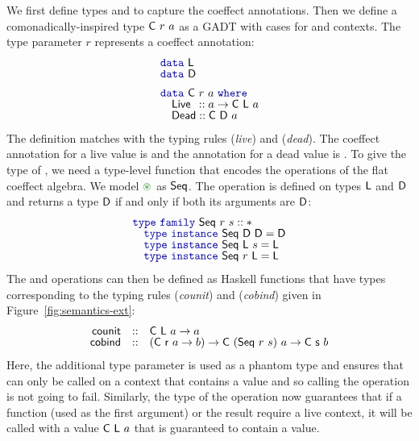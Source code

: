 We first define types  and  to capture the coeffect annotations.
Then we define a comonadically-inspired type $\textnormal{\sffamily C}~r~a$ as a GADT with cases for
 and  contexts. The type parameter $r$ represents a coeffect
annotation:
%
\begin{equation*}
\begin{array}{l}
\kvd{data}~\ident{L} \\[-0.2em]
\kvd{data}~\ident{D} \\[0.5em]
\kvd{data}~\ident{C}~r~a~\kvd{where} \\[-0.2em]
\quad \ident{Live} \hspace{0.45em}:: a \rightarrow \ident{C}~\ident{L}~a\\[-0.2em]
\quad \ident{Dead} :: \ident{C}~\ident{D}~a
\end{array}
\end{equation*}
%
The definition matches with the typing rules (\emph{live}) and (\emph{dead}). The coeffect
annotation for a live value is  and the annotation for a dead value is .
To give the type of , we need a type-level function that encodes the operations
of the flat coeffect algebra. We model $\cseq$ as $\textnormal{\sffamily Seq}$. The operation is defined
on types $\textnormal{\sffamily L}$ and $\textnormal{\sffamily D}$ and returns a type $\textnormal{\sffamily D}$ if and only if both its
arguments are $\textnormal{\sffamily D}$:
%
\begin{equation*}
\begin{array}{l}
\kvd{type}~\kvd{family}~\ident{Seq}~r~s :: *\\[-0.2em]
\quad \kvd{type}~\kvd{instance}~\ident{Seq}~\ident{D}~\ident{D} = \ident{D}\\[-0.2em]
\quad \kvd{type}~\kvd{instance}~\ident{Seq}~\ident{L}~s = \ident{L}\\[-0.2em]
\quad \kvd{type}~\kvd{instance}~\ident{Seq}~r~\ident{L} = \ident{L}
\end{array}
\end{equation*}
%
The  and  operations can then be defined as Haskell functions
that have types corresponding to the typing rules (\emph{counit}) and (\emph{cobind}) given
in Figure~\ref{fig:semantics-ext}:
%
\begin{equation*}
\begin{array}{rcl}
\textnormal{\sffamily counit} &::& \textnormal{\sffamily C}~\textnormal{\sffamily L}~a \rightarrow a \\[-0.2em]
\textnormal{\sffamily cobind} &::& (\textnormal{\sffamily C}~\textnormal{\sffamily r}~a \rightarrow b) \rightarrow \textnormal{\sffamily C}~(\textnormal{\sffamily Seq}~r~s)~a \rightarrow \textnormal{\sffamily C}~\textnormal{\sffamily s}~b
\end{array}
\end{equation*}
%
Here, the additional type parameter is used as a phantom type \cite{types-phantom} and ensures that
 can only be called on a context that contains a value and so calling the operation
is not going to fail. Similarly, the type of the  operation now guarantees that if a
function (used as the first argument) or the result require a live context, it will be called with
a value $\textnormal{\sffamily C}~\textnormal{\sffamily L}~a$ that is guaranteed to contain a value.

